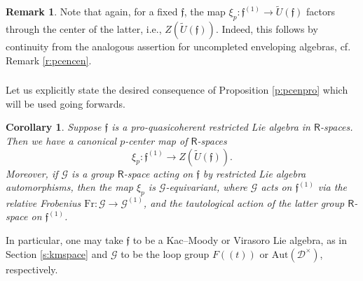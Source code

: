 \documentclass{amsart}
\newtheorem{Cor}[Thm]{Corollary}
\theoremstyle{definition}
\newtheorem{Rem}[Thm]{Remark}
\newcommand{\uHom}{\underline{\on{Hom}}}
\newcommand{\Pro}{\on{Pro}}
\newcommand{\sss}{\subsubsection{}}
\newcommand{\fr}{^\on{(1)}}
\newcommand{\D}{\sD}
\newcommand{\sD}{\mathscr{D}}
\newcommand{\QCoh}{\on{QCoh}}
\newcommand{\on}{\mathrm}
\newcommand{\Ring}{\mathsf{R}}
\newcommand{\ff}{\mathfrak{f}}
\numberwithin{equation}{section}
\begin{document}
\begin{Rem} Note that again, for a fixed $\ff$, the map $\xi_p: \ff\fr \rightarrow \widetilde{U}(\ff)$ factors through the center of the latter, i.e., $Z(\widetilde{U}(\ff))$. Indeed, this follows by continuity from the analogous assertion for uncompleted enveloping algebras, cf. Remark \ref{r:pcencen}. 
\end{Rem}



\sss Let us explicitly state the desired consequence of Proposition \ref{p:pcenpro} which will be used going forwards. 

\begin{Cor}\label{p:p-cent} Suppose $\ff$ is a pro-quasicoherent restricted Lie algebra in  $\Ring$-spaces. Then we have a canonical $p$-center map of $\Ring$-spaces
$$\xi_p: \ff\fr \rightarrow Z(\widetilde{U}(\ff)).$$
Moreover, if $\mathscr{G}$ is a group $\Ring$-space acting on $\ff$ by restricted Lie algebra automorphisms, then the map $\xi_p$ is $\mathscr{G}$-equivariant, where $\mathscr{G}$ acts on $\ff\fr$ via the relative Frobenius $\on{Fr}: \mathscr{G} \rightarrow \mathscr{G}\fr$, and the tautological action of the latter group $\Ring$-space on $\ff^{(1)}$. 
\end{Cor} 

In particular, one may take $\ff$ to be a Kac--Moody  or Virasoro Lie algebra, as in Section \ref{s:kmspace} and $\mathscr{G}$ to be the loop group $F(\!(t)\!)$ or $\on{Aut}(\D^\times)$, respectively.  
\end{document}
